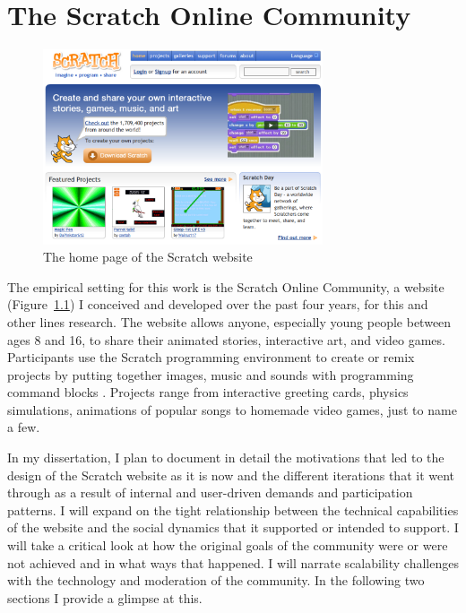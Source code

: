 \chapter{The Scratch Online Community}

\begin{figure}
\centering
\includegraphics[width=3.25in]{figures/websitehomepage.png}
\caption{The home page of the Scratch website}
\label{fig:websitehomepage}
\end{figure}

The empirical setting for this work is the Scratch Online Community, a website (Figure~\ref{fig:websitehomepage}) I conceived and developed over the past four years, for this and other lines research.
The website allows anyone, especially young people between ages 8 and 16, to share their animated stories, interactive art, and video games. Participants use the Scratch programming environment to create or remix projects by putting together images, music and sounds with programming command blocks \citep{resnick_scratch:_2009}.
Projects range from interactive greeting cards, physics simulations, animations of popular songs to homemade video games, just to name a few.  

In my dissertation, I plan to document in detail the motivations that led to the design of the Scratch website as it is now and the different iterations that it went through as a result of internal and user-driven demands and participation patterns.
I will expand on the tight relationship between the technical capabilities of the website and the social dynamics that it supported or intended to support.
I will take a critical look at how the original goals of the community were or were not achieved and in what ways that happened. 
I will narrate scalability challenges with the technology and moderation of the community.
In the following two sections I provide a glimpse at this.

